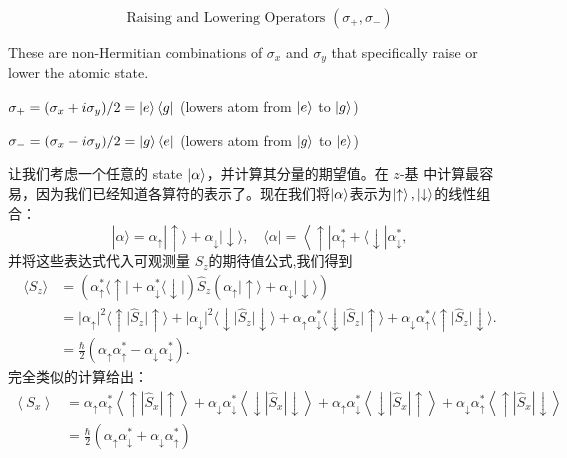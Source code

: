 \[
\boxed{\text{Raising and Lowering Operators } (\sigma_+, \sigma_-)}
\]

These are non-Hermitian combinations of \(\sigma_x \) and \(\sigma_y\) that specifically raise or lower the atomic state.

\(\sigma_+ = (\sigma_x + i\sigma_y)/2 = \ket{e}\bra{g} \) (lowers atom from \(\ket{e}\) to
\(\ket{g}\))

\(\sigma_- = (\sigma_x - i\sigma_y)/2 = \ket{g}\bra{e} \) (lowers atom from \(\ket{g}\) to
\(\ket{e}\))

让我们考虑一个任意的 state $\ket{\alpha} $，并计算其分量的期望值。在 \(z\)-基 中计算最容易，因为我们已经知道各算符的表示了。现在我们将$\ket{\alpha} $表示为$\ket{\uparrow},\ket{\downarrow}$的线性组合：
\begin{equation}
	|\alpha\rangle=\alpha_{\uparrow}|\uparrow\rangle+\alpha_{\downarrow}|\downarrow\rangle,\quad\langle\alpha|=\left\langle\uparrow\left|\alpha_{\uparrow}^*+\langle\downarrow\right|\alpha_{\downarrow}^*\right.,
\end{equation}
并将这些表达式代入可观测量 $S_{z}$的期待值公式,我们得到
\begin{equation}
	\begin{aligned}
		\langle S_z \rangle &= \left( \alpha_{\uparrow}^* \langle \uparrow \rvert + \alpha_{\downarrow}^* \langle \downarrow \rvert \right) \hat{S}_z \left( \alpha_{\uparrow} \lvert \uparrow \rangle + \alpha_{\downarrow} \lvert \downarrow \rangle \right) \\
		&= \lvert \alpha_{\uparrow} \rvert^2 \langle \uparrow \rvert \hat{S}_z \lvert \uparrow \rangle
		+ \lvert \alpha_{\downarrow} \rvert^2 \langle \downarrow \rvert \hat{S}_z \lvert \downarrow \rangle
		+ \alpha_{\uparrow} \alpha_{\downarrow}^* \langle \downarrow \rvert \hat{S}_z \lvert \uparrow \rangle
		+ \alpha_{\downarrow} \alpha_{\uparrow}^* \langle \uparrow \rvert \hat{S}_z \lvert \downarrow \rangle.\\
		&=\frac{\hbar}{2}\left(\alpha_{\uparrow}\alpha_{\uparrow}^*-\alpha_{\downarrow}\alpha_{\downarrow}^*\right).
	\end{aligned}
\end{equation}
完全类似的计算给出：
\begin{equation}
	\begin{aligned}
		\left\langle S_x\right\rangle&=\alpha_{\uparrow}\alpha_{\uparrow}^*\left\langle\uparrow\left|\hat{S}_x\right|\uparrow\right\rangle+\alpha_{\downarrow}\alpha_{\downarrow}^*\left\langle\downarrow\left|\hat{S}_x\right|\downarrow\right\rangle+\alpha_{\uparrow}\alpha_{\downarrow}^*\left\langle\downarrow\left|\hat{S}_x\right|\uparrow\right\rangle+\alpha_{\downarrow}\alpha_{\uparrow}^*\left\langle\uparrow\left|\hat{S}_x\right|\downarrow\right\rangle\\
		&=\frac{\hbar}{2}\left(\alpha_{\uparrow}\alpha_{\downarrow}^*+\alpha_{\downarrow}\alpha_{\uparrow}^*\right)
	\end{aligned}
\end{equation}

